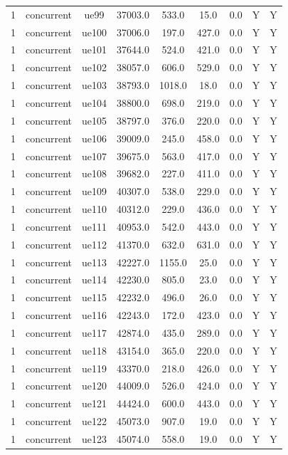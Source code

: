 \begin{table}[ht]
\begin{tabular}{|c|c|c|c|c|c|c|c|c|}
1 & concurrent & ue99 & 37003.0 & 533.0 & 15.0 & 0.0 & Y & Y \\
1 & concurrent & ue100 & 37006.0 & 197.0 & 427.0 & 0.0 & Y & Y \\
1 & concurrent & ue101 & 37644.0 & 524.0 & 421.0 & 0.0 & Y & Y \\
1 & concurrent & ue102 & 38057.0 & 606.0 & 529.0 & 0.0 & Y & Y \\
1 & concurrent & ue103 & 38793.0 & 1018.0 & 18.0 & 0.0 & Y & Y \\
1 & concurrent & ue104 & 38800.0 & 698.0 & 219.0 & 0.0 & Y & Y \\
1 & concurrent & ue105 & 38797.0 & 376.0 & 220.0 & 0.0 & Y & Y \\
1 & concurrent & ue106 & 39009.0 & 245.0 & 458.0 & 0.0 & Y & Y \\
1 & concurrent & ue107 & 39675.0 & 563.0 & 417.0 & 0.0 & Y & Y \\
1 & concurrent & ue108 & 39682.0 & 227.0 & 411.0 & 0.0 & Y & Y \\
1 & concurrent & ue109 & 40307.0 & 538.0 & 229.0 & 0.0 & Y & Y \\
1 & concurrent & ue110 & 40312.0 & 229.0 & 436.0 & 0.0 & Y & Y \\
1 & concurrent & ue111 & 40953.0 & 542.0 & 443.0 & 0.0 & Y & Y \\
1 & concurrent & ue112 & 41370.0 & 632.0 & 631.0 & 0.0 & Y & Y \\
1 & concurrent & ue113 & 42227.0 & 1155.0 & 25.0 & 0.0 & Y & Y \\
1 & concurrent & ue114 & 42230.0 & 805.0 & 23.0 & 0.0 & Y & Y \\
1 & concurrent & ue115 & 42232.0 & 496.0 & 26.0 & 0.0 & Y & Y \\
1 & concurrent & ue116 & 42243.0 & 172.0 & 423.0 & 0.0 & Y & Y \\
1 & concurrent & ue117 & 42874.0 & 435.0 & 289.0 & 0.0 & Y & Y \\
1 & concurrent & ue118 & 43154.0 & 365.0 & 220.0 & 0.0 & Y & Y \\
1 & concurrent & ue119 & 43370.0 & 218.0 & 426.0 & 0.0 & Y & Y \\
1 & concurrent & ue120 & 44009.0 & 526.0 & 424.0 & 0.0 & Y & Y \\
1 & concurrent & ue121 & 44424.0 & 600.0 & 443.0 & 0.0 & Y & Y \\
1 & concurrent & ue122 & 45073.0 & 907.0 & 19.0 & 0.0 & Y & Y \\
1 & concurrent & ue123 & 45074.0 & 558.0 & 19.0 & 0.0 & Y & Y \\

\end{tabular}
\end{table}
